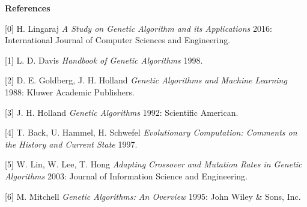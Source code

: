 \documentclass[a4paper]{article}
\begin{document}
\begin{center}
\textbf{References}
\end{center}
\begin{bib}




[0] H. Lingaraj {\em A Study on Genetic Algorithm and its Applications} 2016: International Journal of Computer Sciences and Engineering.

[1] L. D. Davis {\em Handbook of Genetic Algorithms} 1998.

[2] D. E. Goldberg, J. H. Holland {\em Genetic Algorithms and Machine Learning} 1988: Kluwer Academic Publishers.

[3] J. H. Holland {\em Genetic Algorithms} 1992: Scientific American.

[4] T. Back, U. Hammel, H. Schwefel {\em Evolutionary Computation: Comments on the History and Current State} 1997.

[5] W. Lin, W. Lee, T. Hong {\em Adapting Crossover and Mutation Rates in Genetic Algorithms} 2003: Journal of Information Science and Engineering.

[6] M. Mitchell {\em Genetic Algorithms: An Overview} 1995: John Wiley & Sons, Inc.

\end{bib}


\begin{sreadings}



\end{sreadings}
\end{document}
